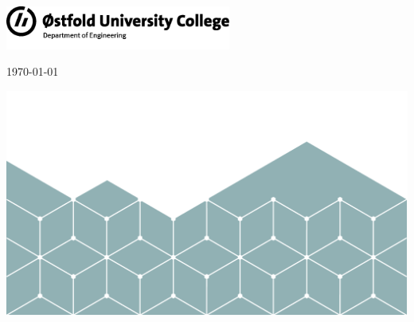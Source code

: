 
\begin{titlepage}

    \begin{flushright}
        \includegraphics*[width=74mm]{images/logo.png}
    \end{flushright}

    \vspace{2cm}



    \begin{center}
        {\LARGE \textbf{\thesisTitle}}
    \end{center}

    \vspace{0.5cm}


    \vspace{1cm}

    {\large \authorName}


    \vspace{1cm}

    {\large \ProgramName}

    \vspace{0.5cm}

    {\large \DepartmentName}

    \vspace{1cm}

    {\large \supervisorName}

    \vspace{2cm}

    {\large \today}

    \centering
    \vspace*{\fill}
    \includegraphics*[width=\textwidth]{images/cover.png}

    \thispagestyle{empty} %
\end{titlepage}
